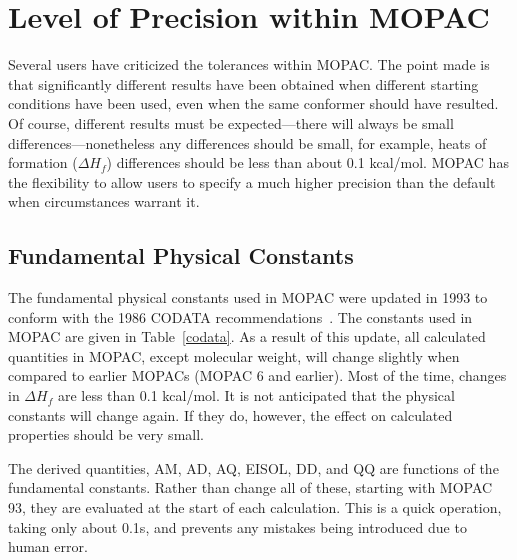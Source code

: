 \section{Level of Precision within MOPAC}
 
Several users have criticized the  tolerances  within  MOPAC.   The point 
made  is  that significantly different results have been obtained when
different starting conditions have been used, even  when  the  same conformer 
should  have  resulted.  Of course, different results must be expected---there
will always be small differences---nonetheless  any differences   should   be 
small,  for example,  heats  of  formation   ($\Delta H_f$)   differences should be less
than about 0.1  kcal/mol.   MOPAC  has  the flexibility  to  allow  users  to 
specify a much higher precision than the default when circumstances warrant it.

\subsection{Fundamental Physical Constants}
The fundamental physical constants used in MOPAC were updated in 1993 to
conform with the 1986 CODATA recommendations~\cite{codata}.  The constants used
in MOPAC are given in Table~\ref{codata}.  As a result of this update, all
calculated quantities in MOPAC, except molecular weight, will change slightly
when compared to earlier MOPACs (MOPAC 6 and earlier).  Most of the time,
changes in $\Delta H_f$ are less than 0.1 kcal/mol.  It is not anticipated that
the physical constants will change again.  If they do, however, the effect on
calculated properties should be very small.

The derived quantities, AM, AD, AQ, EISOL, DD, and QQ are functions of the
fundamental constants.  Rather than change all of these, starting with MOPAC
93, they are evaluated  at the start of each calculation.  This is a quick
operation, taking only about 0.1s, and prevents any mistakes being introduced
due to human error. 

